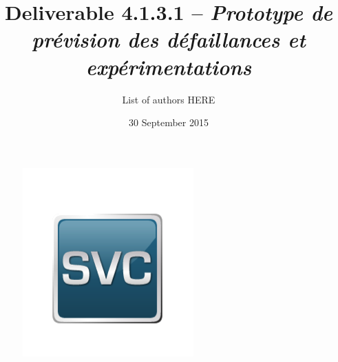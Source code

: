 \documentclass[a4paper]{report}   %
\begin{document}
	\begin{figure}
	    			\includegraphics[scale=0.45]{inputs/img/svc}
	  		\end{figure}

\title{Deliverable 4.1.3.1 -- \emph{Prototype de prévision des défaillances et expérimentations}}   %
\author{List of authors HERE}         %
\date{30 September 2015}    %
\maketitle

\begin{abstract}

\end{abstract}

\tableofcontents

\newpage
\listoffigures
\newpage
\listoftables
\newpage












%



\end{document}
